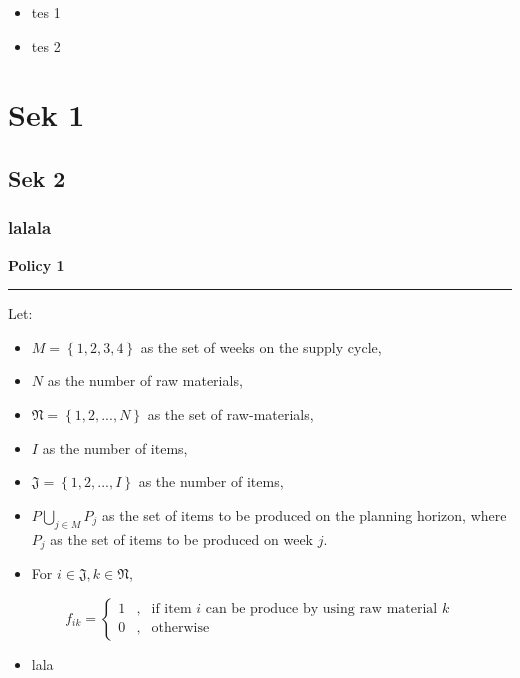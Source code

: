 \documentclass[
]{article}
\providecommand{\tightlist}{%
  \setlength{\itemsep}{0pt}\setlength{\parskip}{0pt}}
\begin{document}
\begin{itemize}
\tightlist
\item
  tes 1
\item
  tes 2
\end{itemize}

\hypertarget{sek-1}{%
\section{Sek 1}\label{sek-1}}

\hypertarget{sek-2}{%
\subsection{Sek 2}\label{sek-2}}

\hypertarget{lalala}{%
\subsubsection{lalala}\label{lalala}}

\textbf{Policy 1}

\begin{center}\rule{0.5\linewidth}{0.5pt}\end{center}

Let:

\begin{itemize}
\tightlist
\item
  \(M = \left\{ 1,2,3,4 \right\}\) as the set of weeks on the supply
  cycle,
\item
  \(N\) as the number of raw materials,
\item
  \(\mathfrak{N}= \left\{ 1,2,...,N \right\}\) as the set of
  raw-materials,
\item
  \(I\) as the number of items,
\item
  \(\mathfrak{J} = \left\{ 1, 2, ..., I \right\}\) as the number of
  items,
\item
  \(P \bigcup_{j \in M} P_j\) as the set of items to be produced on the
  planning horizon, where \(P_j\) as the set of items to be produced on
  week \(j\).
\item
  For \(i \in \mathfrak{J}, k \in \mathfrak{N}\),
\end{itemize}

\[f_{ik} = 
\left\{\begin{matrix}
1 & , & \text{if item } i \text{ can be produce by using raw material } k  \\ 
0 & , & \text{otherwise}
\end{matrix}\right. 
\]

\begin{itemize}
\tightlist
\item
  lala
\end{itemize}
\end{document}
